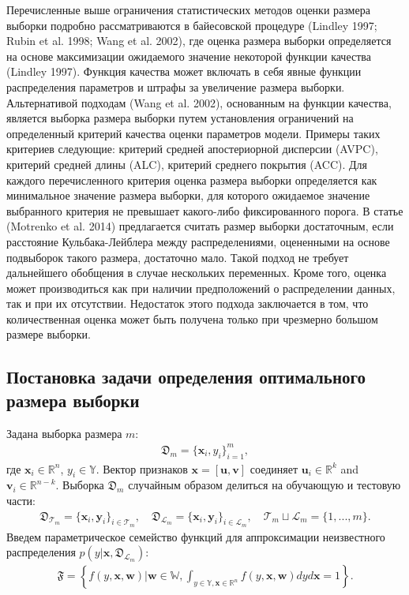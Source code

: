 Перечисленные выше ограничения статистических методов оценки размера выборки подробно рассматриваются в байесовской процедуре (Lindley 1997; Rubin et al. 1998; Wang et al. 2002), где оценка размера выборки определяется на основе максимизации ожидаемого значение некоторой функции качества (Lindley 1997). Функция качества может включать в себя явные функции распределения параметров и штрафы за увеличение размера выборки. Альтернативой подходам (Wang et al. 2002), основанным на функции качества, является выборка размера выборки путем установления ограничений на определенный критерий качества оценки параметров модели. Примеры таких критериев следующие: критерий средней апостериорной дисперсии (AVPC), критерий средней длины (ALC), критерий среднего покрытия (ACC). Для каждого перечисленного критерия оценка размера выборки определяется как минимальное значение размера выборки, для которого ожидаемое значение выбранного критерия не превышает какого-либо фиксированного порога. В статье (Motrenko et al. 2014) предлагается считать размер выборки достаточным, если расстояние Кульбака-Лейблера между распределениями, оцененными на основе подвыборок такого размера, достаточно мало. Такой подход не требует дальнейшего обобщения в случае нескольких переменных. Кроме того, оценка может производиться как при наличии предположений о распределении данных, так и при их отсутствии. Недостаток этого подхода заключается в том, что количественная оценка может быть получена только при чрезмерно большом размере выборки.

\subsection{Постановка задачи определения оптимального размера выборки}

Задана выборка размера $m$:
\[
\label{eq:ps:1}
\begin{aligned}
	\mathfrak{D}_{m} = \{\textbf{x}_i, y_i\}_{i = 1}^{m},
\end{aligned}
\]
где $\textbf{x}_i\in \mathbb{R}^{n}$, $y_i\in \mathbb{Y}$. Вектор признаков $\textbf{x} = [\textbf{u}, \textbf{v}]$ соединяет $\textbf{u}_i\in \mathbb{R}^{k}$ and $ \textbf{v}_i\in \mathbb{R}^{n-k}$.
Выборка $\mathfrak{D}_{m}$ случайным образом делиться на обучающую и тестовую части:
\[
\label{eq:ps:2}
\begin{aligned}
	\mathfrak{D}_{\mathcal{T}_{m}} = \{\textbf{x}_i, \textbf{y}_i\}_{i \in \mathcal{T}_{m}}, \quad \mathfrak{D}_{\mathcal{L}_{m}} = \{\textbf{x}_i, \textbf{y}_i\}_{i \in \mathcal{L}_{m}}, \quad  \mathcal{T}_{m}\sqcup\mathcal{L}_{m} = \{1, ..., m\}.
\end{aligned}
\]
Введем параметрическое семейство функций для аппроксимации неизвестного распределения $p(y|\textbf{x}, \mathfrak{D}_{\mathcal{L}_{m}})$:
\[
\label{eq:ps:3}
\begin{aligned}
	\mathfrak{F} = \left\{f\left(y,\textbf{x}, \textbf{w}\right)|\textbf{w}\in\mathbb{W}, \int_{y\in \mathbb{Y}, \textbf{x}\in\mathbb{R}^{n}}f\left(y, \textbf{x}, \textbf{w}\right)dyd\textbf{x}=1\right\}.
\end{aligned}
\]


